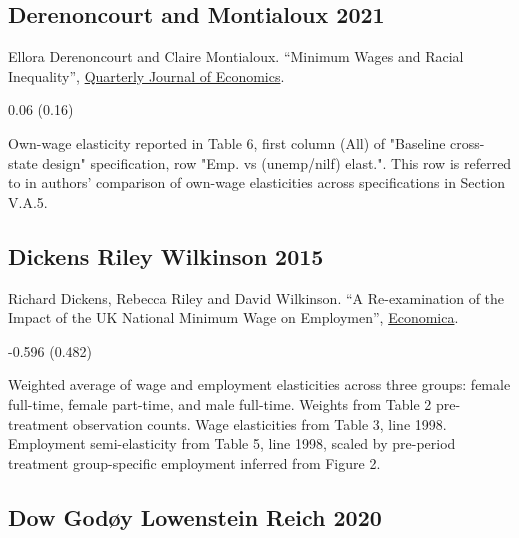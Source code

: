 \subsection*{Derenoncourt and Montialoux 2021}
\vspace{-0.7em}

\noindent Ellora Derenoncourt and Claire Montialoux. ``Minimum Wages and Racial Inequality'', \href{https://doi.org/10.1093/qje/qjaa031}{Quarterly Journal of Economics}.

\vspace{0.7em}

 0.06 (0.16)

\vspace{0.7em}

 Own-wage elasticity reported in Table 6, first column (All) of "Baseline cross-state design" specification, row "Emp. vs (unemp/nilf) elast.". This row is referred to in authors' comparison of own-wage elasticities across specifications in Section V.A.5.

\subsection*{Dickens Riley Wilkinson 2015}
\vspace{-0.7em}

\noindent Richard Dickens, Rebecca Riley and David Wilkinson. ``A Re-examination of the Impact of the UK National Minimum Wage on Employmen'', \href{https://doi.org/10.1111/ecca.12158}{Economica}.

\vspace{0.7em}

 -0.596 (0.482)

\vspace{0.7em}

 Weighted average of wage and employment elasticities across three groups: female full-time, female part-time, and male full-time. Weights from Table 2 pre-treatment observation counts. Wage elasticities from Table 3, line 1998. Employment semi-elasticity from Table 5, line 1998, scaled by pre-period treatment group-specific employment inferred from Figure 2.

\subsection*{Dow Godøy Lowenstein Reich 2020}
\vspace{-0.7em}

